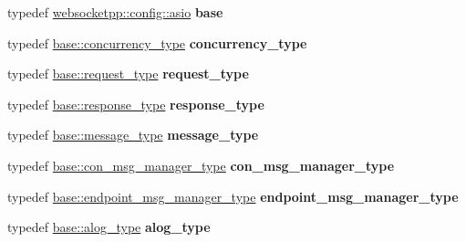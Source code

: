 \begin{DoxyCompactItemize}
\item 
\mbox{\label{classconfig_ae009ac61a0f75667d6f2ffd5bfe1e020}} 
typedef \mbox{\hyperlink{structwebsocketpp_1_1config_1_1asio}{websocketpp\+::config\+::asio}} {\bfseries base}
\item 
\mbox{\label{classconfig_aa53393e92725668936061e3b3a1f3894}} 
typedef \mbox{\hyperlink{classwebsocketpp_1_1concurrency_1_1basic}{base\+::concurrency\+\_\+type}} {\bfseries concurrency\+\_\+type}
\item 
\mbox{\label{classconfig_a94ed41ef4d54941205f17507519ff1ac}} 
typedef \mbox{\hyperlink{classwebsocketpp_1_1http_1_1parser_1_1request}{base\+::request\+\_\+type}} {\bfseries request\+\_\+type}
\item 
\mbox{\label{classconfig_ae993ff15fd839cf76c28fa958b9c4cd2}} 
typedef \mbox{\hyperlink{classwebsocketpp_1_1http_1_1parser_1_1response}{base\+::response\+\_\+type}} {\bfseries response\+\_\+type}
\item 
\mbox{\label{classconfig_ac0d22fc7451d6f0e1c4e01827972ce25}} 
typedef \mbox{\hyperlink{classwebsocketpp_1_1message__buffer_1_1message}{base\+::message\+\_\+type}} {\bfseries message\+\_\+type}
\item 
\mbox{\label{classconfig_ae6b351ef7f04da59a76d6daa13582a75}} 
typedef \mbox{\hyperlink{classwebsocketpp_1_1message__buffer_1_1alloc_1_1con__msg__manager}{base\+::con\+\_\+msg\+\_\+manager\+\_\+type}} {\bfseries con\+\_\+msg\+\_\+manager\+\_\+type}
\item 
\mbox{\label{classconfig_a240db3b54e5e920262139446326b92d6}} 
typedef \mbox{\hyperlink{classwebsocketpp_1_1message__buffer_1_1alloc_1_1endpoint__msg__manager}{base\+::endpoint\+\_\+msg\+\_\+manager\+\_\+type}} {\bfseries endpoint\+\_\+msg\+\_\+manager\+\_\+type}
\item 
\mbox{\label{classconfig_a8f3aa3e7ec232dcb93817fc853cfc004}} 
typedef \mbox{\hyperlink{classwebsocketpp_1_1log_1_1basic}{base\+::alog\+\_\+type}} {\bfseries alog\+\_\+type}
\item 
\mbox{\label{classconfig_afb2e5eb6e70ba3b59818243be1057b05}} 

\end{DoxyCompactItemize}
